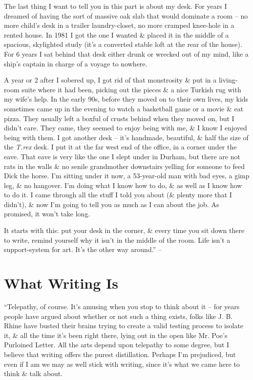 \documentclass{article}
\numberwithin{equation}{section}
\begin{document}
 The last thing I want to tell you in this part is about my desk. For years I dreamed of having the sort of massive oak slab that would dominate a room -- no more child's desk in a trailer laundry-closet, no more cramped knee-hole in a rented house. In 1981 I got the one I wanted \& placed it in the middle of a spacious, skylighted study (it's a converted stable loft at the rear of the house). For 6 years I sat behind that desk either drunk or wrecked out of my mind, like a ship's captain in charge of a voyage to nowhere.

A year or 2 after I sobered up, I got rid of that monstrosity \& put in a living-room suite where it had been, picking out the pieces \& a nice Turkish rug with my wife's help. In the early 90s, before they moved on to their own lives, my kids sometimes came up in the evening to watch a basketball game or a movie \& eat pizza. They usually left a boxful of crusts behind when they moved on, but I didn't care. They came, they seemed to enjoy being with me, \& I know I enjoyed being with them. I got another desk -- it's handmade, beautiful, \& half the size of the \textit{T.rex} desk. I put it at the far west end of the office, in a corner under the eave. That eave is very like the one I slept under in Durham, but there are not rats in the walls \& no senile grandmother downstairs yelling for someone to feed Dick the horse. I'm sitting under it now, a 53-year-old man with bad eyes, a gimp leg, \& no hangover. I'm doing what I know how to do, \& as well as I know how to do it. I came through all the stuff I told you about (\& plenty more that I didn't), \& now I'm going to tell you as much as I can about the job. As promised, it won't take long.

It starts with this: put your desk in the corner, \& every time you sit down there to write, remind yourself why it isn't in the middle of the room. Life isn't a support-system for art. It's the other way around.'' -- \cite[pp. 13--81]{King2010}


\section{What Writing Is}
``Telepathy, of course. It's amusing when you stop to think about it -- for years people have argued about whether or not such a thing exists, folks like J. B. Rhine have busted their brains trying to create a valid testing process to isolate it, \& all the time it's been right there, lying out in the open like Mr. Poe's Purloined Letter. All the arts depend upon telepathy to some degree, but I believe that writing offers the purest distillation. Perhaps I'm prejudiced, but even if I am we may as well stick with writing, since it's what we came here to think \& talk about.
\end{document}

